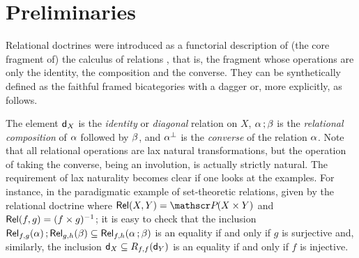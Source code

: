 
\section{Preliminaries}
\label{sect:prelim} 
Relational doctrines \cite{DagninoP23,DagninoP25tac} were introduced as a functorial description of (the core fragment of) the calculus of relations \cite{Tarski41}, 
that is, the fragment whose operations are only the identity, the composition and the converse. 
They can be synthetically defined as the faithful framed bicategories \cite{Shulman08} with a dagger or, more explicitly, as follows.



The element $\mathsf{d}_X$ is the \emph{identity} or \emph{diagonal} relation on $X$, 
$\alpha\mathop{\mathbf{;}}\beta$  is the \emph{relational composition} of $\alpha$ followed by $\beta$, and 
$\alpha^{\bot}$ is the \emph{converse} of the relation $\alpha$.  
% 
Note that all relational operations are lax natural transformations, but 
the operation of taking the converse, being  an involution, is actually strictly natural. 
% 
The requirement of lax naturality becomes clear if one looks at the examples. 
For instance, in the paradigmatic example of set-theoretic relations, given by the relational doctrine \fun{\Rel}{\bop\Set}{\Pos} 
where $\Rel(X,Y)=\PP(X\times Y)$ and  $\mathsf{Rel}(f,g)=(f\times g)^{-1}$; it is easy to check that 
the inclusion
$\mathsf{Rel}_{f,g}(\alpha)\mathop{\mathbf{;}}\mathsf{Rel}_{g,h}(\beta)
\subseteq\mathsf{Rel}_{f,h}(\alpha\mathop{\mathbf{;}}\beta)$
is an equality if and only if $g$ is surjective and, similarly, the inclusion $\mathsf{d}_X 
\subseteq R_{f,f}(\mathsf{d}_Y)$ is an equality if and only if $f$ is injective.

